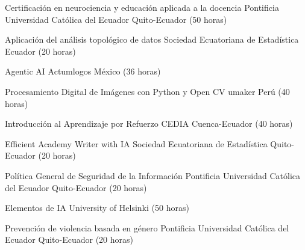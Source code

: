 \documentclass[
    a4paper,
    maincolor=cvblue!70!blue,
    sidecolor=gray!30,
    sectioncolor=cvblue!70!blue,
    sidebarwidth=7.5cm,
    topbottommargin=20pt,
    leftrightmargin=20pt,
]{fortysecondscv}
\begin{document}
    {Certificación en neurociencia y educación aplicada a la docencia}
    {Pontificia Universidad Católica del Ecuador}
    {Quito-Ecuador (50 horas)}







    {Aplicación del análisis topológico de datos}
    {Sociedad Ecuatoriana de Estadística}
    {Ecuador (20 horas)}

    {Agentic AI}
    {Actumlogos}
    {México (36 horas)}

    {Procesamiento Digital de Imágenes con Python y Open CV}
    {umaker}
    {Perú (40 horas)}

    {Introducción al Aprendizaje por Refuerzo}
    {CEDIA}
    {Cuenca-Ecuador (40 horas)}

    {Efficient Academy Writer with IA}
    {Sociedad Ecuatoriana de Estadística}
    {Quito-Ecuador (20 horas)}

    {Política General de Seguridad de la Información}
    {Pontificia Universidad Católica del Ecuador}
    {Quito-Ecuador (20 horas)}

    {Elementos de IA}
    {University of Helsinki}
    {(50 horas)}

    {Prevención de violencia basada en género}
    {Pontificia Universidad Católica del Ecuador}
    {Quito-Ecuador (20 horas)}
\end{document}

